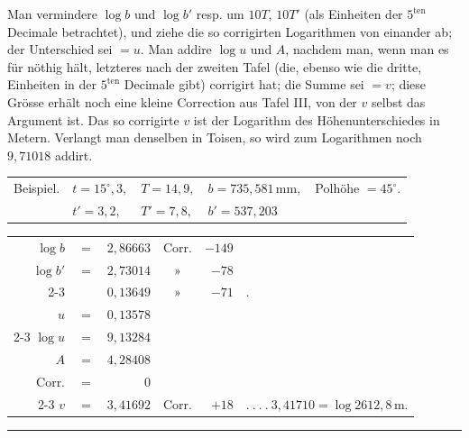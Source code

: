\par\noindent\hspace*{\parindent}Man vermindere $\log b$ und $\log b'$ resp. um $10T$, $10T'$ (als Einheiten der $5^{\mathrm{ten}}$ Decimale betrachtet), und ziehe die so corrigirten Logarithmen von einander ab; der Unterschied sei $=u$. Man addire $\log u$ und $A$, nachdem man, wenn man es für nöthig hält, letzteres nach der zweiten Tafel (die, ebenso wie die dritte, Einheiten in der $5^{\mathrm{ten}}$ Decimale gibt) corrigirt hat; die Summe sei $=v$; diese Grösse erhält noch eine kleine Correction aus Tafel III, von der $v$ selbst das Argument ist. Das so corrigirte $v$ ist der Logarithm des Höhenunterschiedes in Metern. Verlangt man denselben in Toisen, so wird zum Logarithmen noch $9{,}71018$ addirt.
\par\medskip
\noindent\hspace*{.5em}\begin{tabular}{l@{\quad}l@{\quad}l@{\quad}l@{\quad}l}
Beispiel.&$t=15^\circ{,}3,$&$T=14{,}9,$&$b=735{,}581\,\mathrm{mm},$&Polhöhe $=45^\circ$.\\
&$t'=3{,}2,$&$T'=7{,}8,$&$b'=537{,}203$&
\end{tabular}
\par\noindent\hspace*{1.5cm}\begingroup\setlength{\tabcolsep}{2pt}\renewcommand{\arraystretch}{1.2}
\begin{tabular}{r@{\ }c@{\ }r@{\quad}c@{\ }r@{\ }l}
$\log b$&$=$&$2{,}86663$&Corr.&$-149$&\\
$\log b'$&$=$&$2{,}73014$&»&$-78$&\\\cline{2-3}\cline{5-5}
&&$0{,}13649$&»&$-71$&\qquad .\\
$u$&$=$&$0{,}13578$&&&\\\cline{2-3}
$\log u$&$=$&$9{,}13284$&&&\\
$A$&$=$&$4{,}28408$&&&\\
Corr.&$=$&$0$&&&\\\cline{2-3}
$v$&$=$&$3{,}41692$&Corr.&$+18$&$.\ .\ .\ .\ 3{,}41710=\log2612{,}8\,\mathrm{m}.$
\end{tabular}\endgroup
\begin{center}\rule{3.5cm}{.4pt}\end{center}

